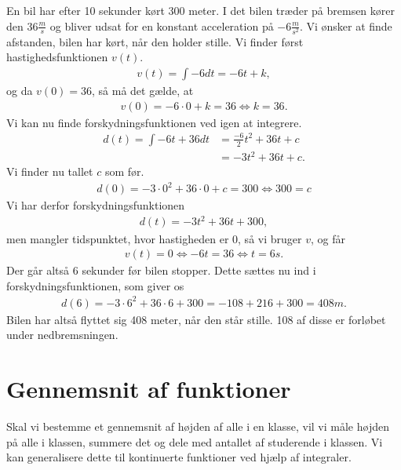 \begin{exa}
	En bil har efter 10 sekunder kørt 300 meter. I det bilen træder på bremsen kører
	den $36\frac{m}{s}$ og bliver udsat for en konstant acceleration på $-6\frac{m}{s^2}$. Vi ønsker at finde afstanden, 
	bilen har kørt, når den holder stille. 
	Vi finder først hastighedsfunktionen $v(t)$.
	\begin{align*}
		v(t) = \int -6 dt = -6t + k,	
	\end{align*}
	og da $v(0) = 36$, så må det gælde, at 
	\begin{align*}
		v(0) = -6\cdot 0 + k = 36 \Leftrightarrow k = 36.
	\end{align*}
	Vi kan nu finde forskydningsfunktionen ved igen at integrere.
	\begin{align*}
		d(t) = \int -6t + 36 dt &= \frac{-6}{2}t^2 + 36t + c \\
		&= -3t^2 + 36t + c.
	\end{align*}
	Vi finder nu tallet $c$ som før.
	\begin{align*}
		d(0) = -3\cdot 0^2 + 36\cdot 0 + c = 300 \Leftrightarrow 300 = c
	\end{align*}
	Vi har derfor forskydningsfunktionen
	\begin{align*}
		d(t) = -3t^2 + 36t + 300,
	\end{align*}
	men mangler tidspunktet, hvor hastigheden er 0, så vi bruger $v$, og får
	\begin{align*}
		v(t) = 0 \Leftrightarrow -6t = 36 \Leftrightarrow t = 6s.
	\end{align*}
	Der går altså 6 sekunder før bilen stopper. Dette sættes nu ind i forskydningsfunktionen, som giver os
	\begin{align*}
		d(6) = -3\cdot 6^2 + 36\cdot 6 + 300 = -108 + 216 + 300 = 408m.
	\end{align*}
	Bilen har altså flyttet sig 408 meter, når den står stille. 108 af disse er forløbet under nedbremsningen. 
\end{exa}

\section*{Gennemsnit af funktioner}

Skal vi bestemme et gennemsnit af højden af alle i en klasse, vil vi måle højden på alle i klassen, summere det og dele med antallet af studerende i klassen. Vi kan generalisere dette til kontinuerte funktioner ved hjælp af integraler.

